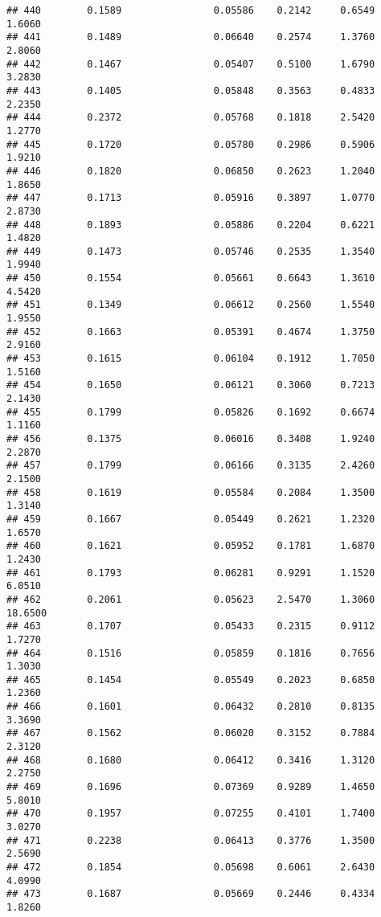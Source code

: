\documentclass[
]{article}
\begin{document}
\begin{verbatim}
## 440        0.1589                0.05586    0.2142     0.6549       1.6060
## 441        0.1489                0.06640    0.2574     1.3760       2.8060
## 442        0.1467                0.05407    0.5100     1.6790       3.2830
## 443        0.1405                0.05848    0.3563     0.4833       2.2350
## 444        0.2372                0.05768    0.1818     2.5420       1.2770
## 445        0.1720                0.05780    0.2986     0.5906       1.9210
## 446        0.1820                0.06850    0.2623     1.2040       1.8650
## 447        0.1713                0.05916    0.3897     1.0770       2.8730
## 448        0.1893                0.05886    0.2204     0.6221       1.4820
## 449        0.1473                0.05746    0.2535     1.3540       1.9940
## 450        0.1554                0.05661    0.6643     1.3610       4.5420
## 451        0.1349                0.06612    0.2560     1.5540       1.9550
## 452        0.1663                0.05391    0.4674     1.3750       2.9160
## 453        0.1615                0.06104    0.1912     1.7050       1.5160
## 454        0.1650                0.06121    0.3060     0.7213       2.1430
## 455        0.1799                0.05826    0.1692     0.6674       1.1160
## 456        0.1375                0.06016    0.3408     1.9240       2.2870
## 457        0.1799                0.06166    0.3135     2.4260       2.1500
## 458        0.1619                0.05584    0.2084     1.3500       1.3140
## 459        0.1667                0.05449    0.2621     1.2320       1.6570
## 460        0.1621                0.05952    0.1781     1.6870       1.2430
## 461        0.1793                0.06281    0.9291     1.1520       6.0510
## 462        0.2061                0.05623    2.5470     1.3060      18.6500
## 463        0.1707                0.05433    0.2315     0.9112       1.7270
## 464        0.1516                0.05859    0.1816     0.7656       1.3030
## 465        0.1454                0.05549    0.2023     0.6850       1.2360
## 466        0.1601                0.06432    0.2810     0.8135       3.3690
## 467        0.1562                0.06020    0.3152     0.7884       2.3120
## 468        0.1680                0.06412    0.3416     1.3120       2.2750
## 469        0.1696                0.07369    0.9289     1.4650       5.8010
## 470        0.1957                0.07255    0.4101     1.7400       3.0270
## 471        0.2238                0.06413    0.3776     1.3500       2.5690
## 472        0.1854                0.05698    0.6061     2.6430       4.0990
## 473        0.1687                0.05669    0.2446     0.4334       1.8260

\end{verbatim}
\end{document}
